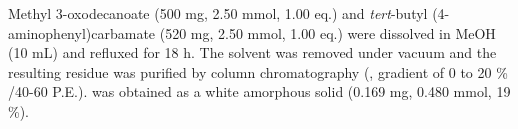 Methyl 3-oxodecanoate  (500 mg, 2.50 mmol, 1.00 eq.) and \textit{tert}-butyl (4-aminophenyl)carbamate  (520 mg, 2.50 mmol, 1.00 eq.) were dissolved in MeOH (10 mL) and refluxed for 18 h. The solvent was removed under vacuum and the resulting residue was purified by column chromatography (, gradient of 0 to 20 \% /40-60 P.E.).  was obtained as a white amorphous solid (0.169 mg, 0.480 mmol, 19 \%).
\\[1\baselineskip]
\\[1\baselineskip]
\\[1\baselineskip]
\\[1\baselineskip]
